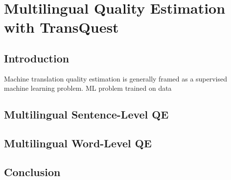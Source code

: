 \chapter{\label{cha:multilingual}Multilingual Quality Estimation with TransQuest}

\section{Introduction}
\cite{sun-etal-2020-exploratory}
Machine translation quality estimation is generally framed as a supervised machine learning problem. 
ML problem \cite{kepler-etal-2019-openkiwi,lee-2020-two} trained on data

\section{Multilingual Sentence-Level QE}

\section{Multilingual Word-Level QE}

\section{Conclusion}